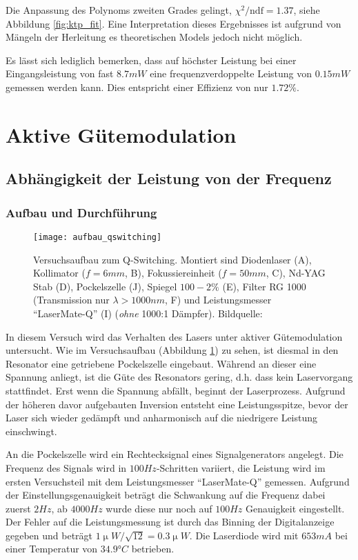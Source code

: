 \documentclass{../Misc/MontavonLaTeX/Montavon}
\newcommand{\fullwidth}{1.0\textwidth}
\begin{document}
Die Anpassung des Polynoms zweiten Grades gelingt, $\chi^2 / \textrm{ndf} = 1.37$, siehe Abbildung \ref{fig:ktp_fit}. 
Eine Interpretation dieses Ergebnisses ist aufgrund von Mängeln der Herleitung es theoretischen Models jedoch nicht möglich.

Es lässt sich lediglich bemerken, dass auf höchster Leistung bei einer Eingangsleistung von fast $8.7 \unit{mW}$ eine frequenzverdoppelte Leistung von $0.15 \unit{mW}$ gemessen werden kann. Dies entspricht einer Effizienz von nur $1.72 \unit{\%}$.

\section{Aktive Gütemodulation}
\subsection{Abhängigkeit der Leistung von der Frequenz}
\subsubsection{Aufbau und Durchführung}
\begin{figure}[htbp]
\centering
\texttt{[image: aufbau\_qswitching]}
\caption{Versuchsaufbau zum Q-Switching. Montiert sind Diodenlaser (A), Kollimator ($f = 6 \unit{mm}$, B), Fokussiereinheit ($f = 50 \unit{mm}$, C), Nd-YAG Stab (D), Pockelszelle (J), Spiegel $100-2 \unit{\%}$ (E), Filter RG 1000 (Transmission nur $\lambda > 1000 \unit{nm}$, F) und Leistungsmesser \enquote{LaserMate-Q} (I) (\emph{ohne} 1000:1 Dämpfer). Bildquelle: \cite[S. 38]{anleitung1}}
\label{fig:aufbau_qswitching}
\end{figure}

In diesem Versuch wird das Verhalten des Lasers unter aktiver Gütemodulation untersucht. Wie im Versuchsaufbau (Abbildung \ref{fig:aufbau_qswitching}) zu sehen, ist diesmal in den Resonator eine getriebene Pockelszelle eingebaut. Während an dieser eine Spannung anliegt, ist die Güte des Resonators gering, d.h. dass kein Laservorgang stattfindet. Erst wenn die Spannung abfällt, beginnt der Laserprozess. Aufgrund der höheren davor aufgebauten Inversion entsteht eine Leistungsspitze, bevor der Laser sich wieder gedämpft und anharmonisch auf die niedrigere Leistung einschwingt. 

An die Pockelszelle wird ein Rechtecksignal eines Signalgenerators angelegt. Die Frequenz des Signals wird in $100 \unit{Hz}$-Schritten variiert, die Leistung wird im ersten Versuchsteil mit dem Leistungsmesser \enquote{LaserMate-Q} gemessen. Aufgrund der Einstellungsgenauigkeit beträgt die Schwankung auf die Frequenz dabei zuerst $2 \unit{Hz}$, ab $4000 \unit{Hz}$ wurde diese nur noch auf $100 \unit{Hz}$ Genauigkeit eingestellt. Der Fehler auf die Leistungsmessung ist durch das Binning der Digitalanzeige gegeben und beträgt $1 \unit{\upmu W} / \sqrt{12} = 0.3 \unit{\upmu W}$.
Die Laserdiode wird mit $653 \unit{mA}$ bei einer Temperatur von $34.9 \unit{\degree C}$ betrieben.
\end{document}
